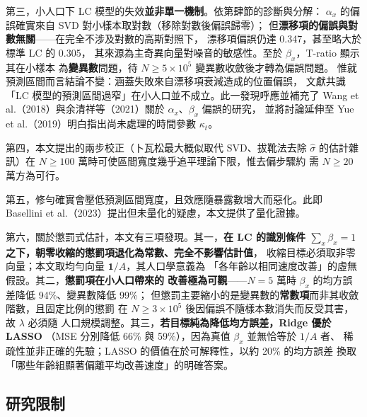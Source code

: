 \documentclass[UTF8, fontset=macnew, a4paper, 12pt]{ctexart}
\begin{document}
第三，小人口下 LC 模型的失效\textbf{並非單一機制}。依第肆節的診斷與分解：
$\alpha_x$ 的偏誤確實來自 SVD 對小樣本取對數（移除對數後偏誤歸零）；
但\textbf{漂移項的偏誤與對數無關}——在完全不涉及對數的高斯對照下，
漂移項偏誤仍達 0.347，甚至略大於標準 LC 的 0.305，
其來源為主奇異向量對噪音的敏感性。至於 $\beta_x$，T-ratio 顯示其在小樣本
為\textbf{變異數}問題，待 $N\ge5\times10^5$ 變異數收斂後才轉為偏誤問題。
惟就預測區間而言結論不變：涵蓋失敗來自漂移項衰減造成的位置偏誤，
文獻共識「LC 模型的預測區間過窄」在小人口並不成立。此一發現呼應並補充了
Wang et al.（2018）與余清祥等（2021）關於 $\alpha_x$、$\beta_x$ 偏誤的研究，
並將討論延伸至 Yue et al.（2019）明白指出尚未處理的時間參數 $\kappa_t$。

第四，本文提出的兩步校正（卜瓦松最大概似取代 SVD、拔靴法去除 $\hat\sigma$
的估計雜訊）在 $N\ge100$ 萬時可使區間寬度幾乎追平理論下限，惟去偏步驟約
需 $N\ge20$ 萬方為可行。

第五，修勻確實會壓低預測區間寬度，且效應隨暴露數增大而惡化。此即
Basellini et al.（2023）提出但未量化的疑慮，本文提供了量化證據。

第六，關於懲罰式估計，本文有三項發現。其一，\textbf{在 LC 的識別條件
$\sum_x\beta_x=1$ 之下，朝零收縮的懲罰項退化為常數、完全不影響估計值}，
收縮目標必須取非零向量；本文取均勻向量 $\mathbf{1}/A$，其人口學意義為
「各年齡以相同速度改善」的虛無假設。其二，\textbf{懲罰項在小人口帶來的
改善極為可觀}——$N=5$ 萬時 $\beta_x$ 的均方誤差降低 94\%、變異數降低 99\%；
但懲罰主要縮小的是變異數的\textbf{常數項}而非其收斂階數，且固定比例的懲罰
在 $N\ge3\times10^5$ 後因偏誤不隨樣本數消失而反受其害，故 $\lambda$ 必須隨
人口規模調整。其三，\textbf{若目標純為降低均方誤差，Ridge 優於 LASSO}
（MSE 分別降低 66\% 與 59\%），因為真值 $\beta_x$ 並無恰等於 $1/A$ 者、
稀疏性並非正確的先驗；LASSO 的價值在於可解釋性，以約 20\% 的均方誤差
換取「哪些年齡組顯著偏離平均改善速度」的明確答案。

\subsection{研究限制}
\end{document}
